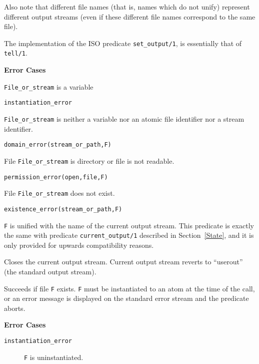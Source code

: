 \begin{description}
    Also note that different file names (that is, names which do not unify) 
    represent different output streams (even if these different file names 
    correspond to the same file).

    The implementation of the ISO predicate {\tt set\_output/1}, is
    essentially that of {\tt tell/1}.

{\bf Error Cases}
\bi
\item  {\tt File\_or\_stream} is  a variable
\bi
\item {\tt instantiation\_error}
\ei
\item {\tt File\_or\_stream} is neither a variable nor an atomic file identifier nor
  a stream identifier.
\bi
\item {\tt domain\_error(stream\_or\_path,F)}
\ei
\item File {\tt File\_or\_stream} is directory or file is not readable. 
\bi
\item {\tt permission\_error(open,file,F)}
\ei
\item File {\tt File\_or\_stream} does not exist. 
\bi
\item {\tt existence\_error(stream\_or\_path,F)}
\ei
\ei

    {\tt F} is unified with the name of the current output stream.
    This predicate is exactly the same with predicate {\tt current\_output/1}
    described in Section~\ref{State}, and it is only provided for
    upwards compatibility reasons.

    Closes the current output stream. 
    Current output stream reverts to ``userout'' (the standard output stream).

    Succeeds if file {\tt F} exists. {\tt F} must be instantiated to
    an atom at the time of the call, or an error message is displayed on
    the standard error stream and the predicate aborts.

{\bf Error Cases}
    \begin {description}
    \item[{\tt instantiation\_error}]
	{\tt F} is uninstantiated.
    \end{description}

\end{description}



